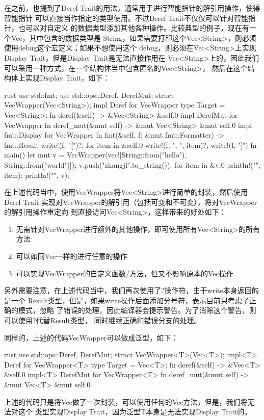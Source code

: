 在之前，也提到了Deref Trait的用法，通常用于进行智能指针的解引用操作，使得智能指针
可以直接当作指定的类型使用。不过Deref Trait不仅仅可以针对智能指针，也可以对自定义
的数据类型添加其他各种操作。比较典型的例子，现在有一个Vec，其中包含的数据类型是
String，如果需要打印这个Vec<String>，则必须使用debug这个宏定义；如果不想使用这个
debug，则必须在Vec<String>上实现Display Trait，但是Display Trait是无法直接作用在
Vec<String>上的，因此我们可以采用一种方式，在一个结构体当中包含匿名的Vec<String>，
然后在这个结构体上实现Display Trait，如下：
\begin{code-block}{rust}
use std::fmt;
use std::ops::{Deref, DerefMut};
struct VecWrapper(Vec<String>);
impl Deref for VecWrapper {
    type Target = Vec<String>;
    fn deref(&self) -> &Vec<String> {
        &self.0
    }
}
impl DerefMut for VecWrapper {
    fn deref_mut(&mut self) -> &mut Vec<String> {
        &mut self.0
    }
}
impl fmt::Display for VecWrapper {
    fn fmt(&self, f: &mut fmt::Formatter) -> fmt::Result {
        write!(f, "[")?;
        for item in &self.0 {
            write!(f, "{}, ", item)?;
        }
        write!(f, "]")
    }
}
fn main() {
    let mut v = VecWrapper(vec![String::from("hello"), String::from("world")]);
    v.push("zhangjl".to_string());
    for item in &v.0 {
        println!("{}", item);
    }
    println!("{}", v);
}
\end{code-block}
在上述代码当中，使用VecWrapper将Vec<String>进行简单的封装，然后使用Deref Trait
实现对VecWrapper的解引用（包括可变和不可变），将对VecWrapper的解引用操作重定向
到直接访问Vec<String>，这样带来的好处如下：
\begin{enumerate}
  \item 无需针对VecWrapper进行额外的其他操作，即可使用所有Vec<String>的所有方法
  \item 可以如同Vec一样的进行任意的操作
  \item 可以实现VecWrapper的自定义函数/方法，但又不影响原本的Vec操作
\end{enumerate}

另外需要注意，在上述代码当中，我们再次使用了?操作符，由于write本身返回的是一个
Result类型，但是，如果write操作后面添加分号符，表示目前只考虑了正确的模式，忽略
了错误的处理，因此编译器会提示警告。为了消除这个警告，则可以使用?代替Result类型，
同时继续正确和错误分支的处理。

同样的，上述的代码VecWrapper可以做成泛型，如下：
\begin{code-block}{rust}
use std::ops::{Deref, DerefMut};
struct VecWrapper<T>(Vec<T>);
impl<T> Deref for VecWrapper<T> {
    type Target = Vec<T>;
    fn deref(&self) -> &Vec<T> {
        &self.0
    }
}
impl<T> DerefMut for VecWrapper<T> {
    fn deref_mut(&mut self) -> &mut Vec<T> {
        &mut self.0
    }
}
\end{code-block}
上述的代码只是将Vec做了一次封装，可以使用任何的Vec方法，但是，我们将无法对这个
类型实现Display Trait，因为泛型T本身是无法实现Display Trait的。

